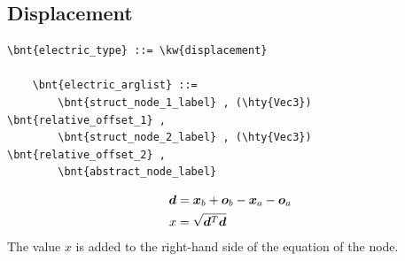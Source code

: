 \subsection{Displacement}
\begin{Verbatim}[commandchars=\\\{\}]
    \bnt{electric_type} ::= \kw{displacement}

    \bnt{electric_arglist} ::=
        \bnt{struct_node_1_label} , (\hty{Vec3}) \bnt{relative_offset_1} ,
        \bnt{struct_node_2_label} , (\hty{Vec3}) \bnt{relative_offset_2} ,
        \bnt{abstract_node_label}
\end{Verbatim}
\begin{subequations}
\begin{align}
	\boldsymbol{d} &= \boldsymbol{x}_b + \boldsymbol{o}_b - \boldsymbol{x}_a - \boldsymbol{o}_a \\
	x &= \sqrt{\boldsymbol{d}^T \boldsymbol{d}}
\end{align}
\end{subequations}
The value $x$ is added to the right-hand side of the equation
of the  node.

